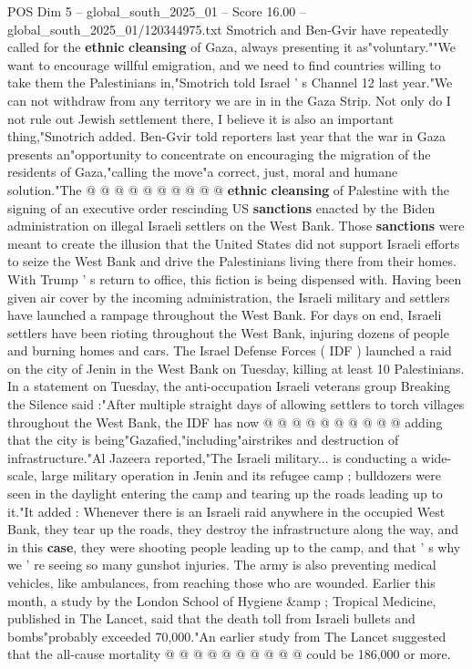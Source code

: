 \begin{textsample}{POS Dim 5 – global\_south\_2025\_01 – Score 16.00 – global\_south\_2025\_01/120344975.txt}
Smotrich and Ben-Gvir have repeatedly called for the \textbf{ethnic} \textbf{cleansing} of Gaza, always presenting it as"voluntary.""We want to encourage willful emigration, and we need to find countries willing to take them the Palestinians in,"Smotrich told Israel ' s Channel 12 last year."We can not withdraw from any territory we are in in the Gaza Strip.
Not only do I not rule out Jewish settlement there, I believe it is also an important thing,"Smotrich added.
Ben-Gvir told reporters last year that the war in Gaza presents an"opportunity to concentrate on encouraging the migration of the residents of Gaza,"calling the move"a correct, just, moral and humane solution."The @ @ @ @ @ @ @ @ @ @ \textbf{ethnic} \textbf{cleansing} of Palestine with the signing of an executive order rescinding US \textbf{sanctions} enacted by the Biden administration on illegal Israeli settlers on the West Bank.
Those \textbf{sanctions} were meant to create the illusion that the United States did not support Israeli efforts to seize the West Bank and drive the Palestinians living there from their homes.
With Trump ' s return to office, this fiction is being dispensed with.
Having been given air cover by the incoming administration, the Israeli military and settlers have launched a rampage throughout the West Bank.
For days on end, Israeli settlers have been rioting throughout the West Bank, injuring dozens of people and burning homes and cars.
The Israel Defense Forces ( IDF ) launched a raid on the city of Jenin in the West Bank on Tuesday, killing at least 10 Palestinians.
In a statement on Tuesday, the anti-occupation Israeli veterans group Breaking the Silence said :"After multiple straight days of allowing settlers to torch villages throughout the West Bank, the IDF has now @ @ @ @ @ @ @ @ @ @ adding that the city is being"Gazafied,"including"airstrikes and destruction of infrastructure."Al Jazeera reported,"The Israeli military... is conducting a wide-scale, large military operation in Jenin and its refugee camp ; bulldozers were seen in the daylight entering the camp and tearing up the roads leading up to it."It added : Whenever there is an Israeli raid anywhere in the occupied West Bank, they tear up the roads, they destroy the infrastructure along the way, and in this \textbf{case}, they were shooting people leading up to the camp, and that ' s why we ' re seeing so many gunshot injuries.
The army is also preventing medical vehicles, like ambulances, from reaching those who are wounded.
Earlier this month, a study by the London School of Hygiene \&amp ; Tropical Medicine, published in The Lancet, said that the death toll from Israeli bullets and bombs"probably exceeded 70,000."An earlier study from The Lancet suggested that the all-cause mortality @ @ @ @ @ @ @ @ @ @ could be 186,000 or more.

\end{textsample}
